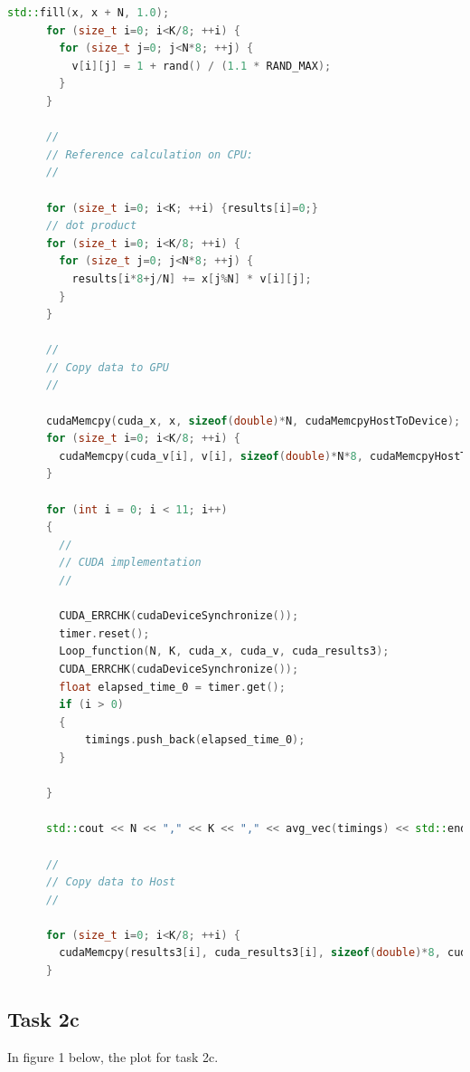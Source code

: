 \begin{lstlisting}[language=C++, title=C++ Cuda Code adaptation 2b]
      std::fill(x, x + N, 1.0);
      for (size_t i=0; i<K/8; ++i) {
        for (size_t j=0; j<N*8; ++j) {
          v[i][j] = 1 + rand() / (1.1 * RAND_MAX);
        }
      }

      //
      // Reference calculation on CPU:
      //

      for (size_t i=0; i<K; ++i) {results[i]=0;}
      // dot product
      for (size_t i=0; i<K/8; ++i) {
        for (size_t j=0; j<N*8; ++j) {
          results[i*8+j/N] += x[j%N] * v[i][j];
        }
      }
      
      //
      // Copy data to GPU
      //
      
      cudaMemcpy(cuda_x, x, sizeof(double)*N, cudaMemcpyHostToDevice);
      for (size_t i=0; i<K/8; ++i) {
        cudaMemcpy(cuda_v[i], v[i], sizeof(double)*N*8, cudaMemcpyHostToDevice);
      }

      for (int i = 0; i < 11; i++)
      {
        //
        // CUDA implementation
        //

        CUDA_ERRCHK(cudaDeviceSynchronize());
        timer.reset(); 
        Loop_function(N, K, cuda_x, cuda_v, cuda_results3);
        CUDA_ERRCHK(cudaDeviceSynchronize());
        float elapsed_time_0 = timer.get();
        if (i > 0)
        {
            timings.push_back(elapsed_time_0);
        }

      }

      std::cout << N << "," << K << "," << avg_vec(timings) << std::endl;

      //
      // Copy data to Host
      //

      for (size_t i=0; i<K/8; ++i) {
        cudaMemcpy(results3[i], cuda_results3[i], sizeof(double)*8, cudaMemcpyDeviceToHost);
      }
\end{lstlisting}

\pagebreak

\subsection{Task 2c}

In figure 1 below, the plot for task 2c.

